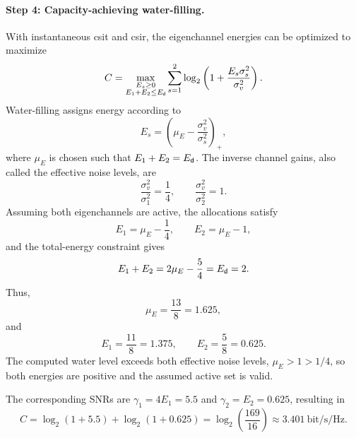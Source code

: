 \paragraph{Step 4: Capacity-achieving water-filling.}
With instantaneous \ac{csit} and \ac{csir}, the eigenchannel energies can be optimized to maximize
\begin{equation*}
	C=\max_{\substack{E_s\geq0\\E_1+E_2\leq E_{\mathsf{d}}}}
	\sum_{s=1}^{2}\log_2\left(1+\frac{E_s\sigma_s^2}{\sigma_v^2}\right).
\end{equation*}
Water-filling assigns energy according to
\begin{equation*}
	E_s=\left(\mu_E-\frac{\sigma_v^2}{\sigma_s^2}\right)_+,
\end{equation*}
where $\mu_E$ is chosen such that $E_1+E_2=E_{\mathsf{d}}$. The inverse channel gains, also called the effective noise levels, are
\begin{equation*}
	\frac{\sigma_v^2}{\sigma_1^2}=\frac14,
	\qquad
	\frac{\sigma_v^2}{\sigma_2^2}=1.
\end{equation*}
Assuming both eigenchannels are active, the allocations satisfy
\begin{equation*}
	E_1=\mu_E-\frac14,\qquad E_2=\mu_E-1,
\end{equation*}
and the total-energy constraint gives
\begin{equation*}
	E_1+E_2=2\mu_E-\frac54=E_{\mathsf{d}}=2.
\end{equation*}
Thus,
\begin{equation*}
	\mu_E=\frac{13}{8}=1.625,
\end{equation*}
and
\begin{equation}
	\boxed{
		E_1=\frac{11}{8}=1.375,\qquad
		E_2=\frac58=0.625.
	}
	\label{eq06:p2p-waterfill}
\end{equation}
The computed water level exceeds both effective noise levels, $\mu_E>1>1/4$, so both energies are positive and the assumed active set is valid.

The corresponding SNRs are $\gamma_1=4E_1=5.5$ and $\gamma_2=E_2=0.625$, resulting in
\begin{equation}
	\boxed{
		C=\log_2(1+5.5)+\log_2(1+0.625)
		=\log_2\left(\frac{169}{16}\right)
		\approx3.401\ \text{bit/s/Hz}.
	}
	\label{eq06:p2p-capacity}
\end{equation}

